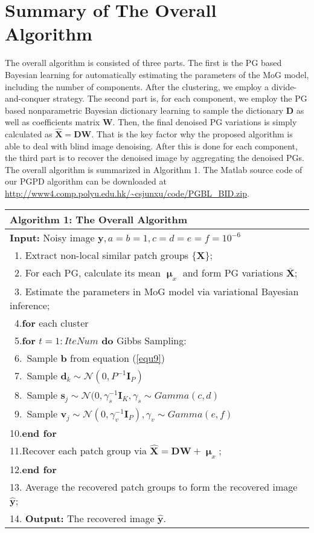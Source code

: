 \documentclass[runningheads]{llncs}
\begin{document}
\section{Summary of The Overall Algorithm}
The overall algorithm is consisted of three parts. The first is the PG based Bayesian learning for automatically estimating the parameters of the MoG model, including the number of components. After the clustering, we employ a divide-and-conquer strategy. The second part is, for each component, we employ the PG based nonparametric Bayesian dictionary learning to sample the dictionary $\mathbf{D}$ as well as coefficients matrix $\mathbf{W}$. Then, the final denoised PG variations is simply calculated as $\hat{\mathbf{X}} = \mathbf{D}\mathbf{W}$. That is the key factor why the proposed algorithm is able to deal with blind image denoising. After this is done for each component, the third part is to recover the denoised image by aggregating the denoised PGs. The overall algorithm is summarized in Algorithm 1. The Matlab source code of our PGPD algorithm can be downloaded at \url{http://www4.comp.polyu.edu.hk/~csjunxu/code/PGBL_BID.zip}.
\begin{table}[t]
\centering
\label{alg}
\begin{tabular}{l}
\hline
\textbf{Algorithm 1}: The Overall Algorithm
\\
\hline
\textbf{Input:} Noisy image $\mathbf{y}, a=b=1,c=d=e=f=10^{-6}$
\\
\ 1. Extract non-local similar patch groups $\{\mathbf{X}\}$;
\\
\ 2. For each PG, calculate its mean $\boldsymbol{\upmu}_{x}$ and form PG variations $\mathbf{\overline{X}}$;
\\
\ 3. Estimate the parameters in MoG model via variational Bayesian inference;
\\
\ 4.\quad \textbf{for} each cluster
\\
\ 5.\quad\quad \textbf{for} $t = 1:IteNum$ \textbf{do} Gibbs Sampling:
\\
\ 6.\quad\quad\quad\ Sample $\mathbf{b}$ from equation (\ref{equ9})
\\
\ 7.\quad\quad\quad\ Sample $\mathbf{d}_{k}\sim\mathcal{N}(0,P^{-1}\mathbf{I}_{P})$
\\
\ 8.\quad\quad\quad\ Sample $\mathbf{s}_{j} \sim \mathcal{N}(0,\gamma_{s}^{-1}\mathbf{I}_{K}, \gamma_{s}\sim Gamma(c,d)$
\\
\ 9.\quad\quad\quad\ Sample $\mathbf{v}_{j}\sim\mathcal{N}(0,\gamma_{v}^{-1}\mathbf{I}_{P}), \gamma_{v}\sim Gamma(e,f)$
\\
10.\quad\quad\textbf{end for}
\\
11.\quad Recover each patch group via $\hat{\mathbf{X}}=\mathbf{D}\mathbf{W}+\boldsymbol{\upmu}_{x}$;
\\
12.\quad \textbf{end for}
\\
13. Average the recovered patch groups to form the recovered image $\hat{\mathbf{y}}$;
\\
14. \textbf{Output:} The recovered image $\hat{\mathbf{y}}$.\\
\hline
\end{tabular}
\end{table}
\end{document}
